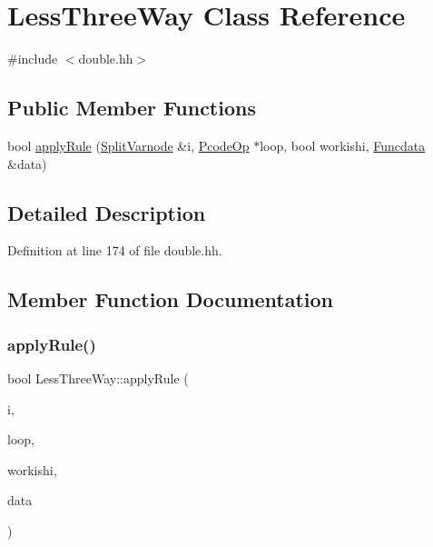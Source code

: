 \hypertarget{class_less_three_way}{}\section{Less\+Three\+Way Class Reference}
\label{class_less_three_way}


{\ttfamily \#include $<$double.\+hh$>$}

\subsection*{Public Member Functions}
\begin{DoxyCompactItemize}
\item 
bool \mbox{\hyperlink{class_less_three_way_a8f691c128645dbb763b63dcfffa08fd7}{apply\+Rule}} (\mbox{\hyperlink{class_split_varnode}{Split\+Varnode}} \&i, \mbox{\hyperlink{class_pcode_op}{Pcode\+Op}} $\ast$loop, bool workishi, \mbox{\hyperlink{class_funcdata}{Funcdata}} \&data)
\end{DoxyCompactItemize}


\subsection{Detailed Description}


Definition at line 174 of file double.\+hh.



\subsection{Member Function Documentation}
\mbox{\label{class_less_three_way_a8f691c128645dbb763b63dcfffa08fd7}} 
\subsubsection{\texorpdfstring{applyRule()}{applyRule()}}
{\footnotesize\ttfamily bool Less\+Three\+Way\+::apply\+Rule (\begin{DoxyParamCaption}\item[{\mbox{\hyperlink{class_split_varnode}{Split\+Varnode}} \&}]{i,  }\item[{\mbox{\hyperlink{class_pcode_op}{Pcode\+Op}} $\ast$}]{loop,  }\item[{bool}]{workishi,  }\item[{\mbox{\hyperlink{class_funcdata}{Funcdata}} \&}]{data }\end{DoxyParamCaption})}




